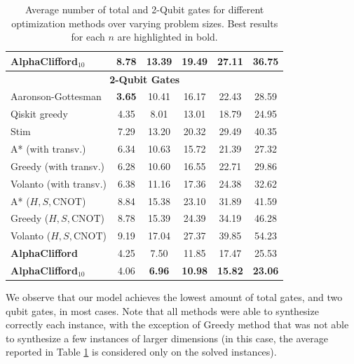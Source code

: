 \documentclass[conference]{IEEEtran}
\begin{document}
\begin{table}[htb]
\begin{tabular}{lccccc}
        \textbf{AlphaClifford$_{10}$} & \textbf{8.78} & \textbf{13.39} & \textbf{19.49} & \textbf{27.11} & \textbf{36.75} \\
        \midrule
        \multicolumn{6}{c}{\textbf{2-Qubit Gates}} \\
        \midrule
        Aaronson-Gottesman & \textbf{3.65} & 10.41 & 16.17 & 22.43 & 28.59 \\
        \textcolor{responsecolour}{Qiskit greedy} & \textcolor{responsecolour}{4.35} & \textcolor{responsecolour}{8.01} & \textcolor{responsecolour}{13.01} & \textcolor{responsecolour}{18.79} & \textcolor{responsecolour}{24.95}\\
        \textcolor{responsecolour}{Stim} & \textcolor{responsecolour}{7.29} & \textcolor{responsecolour}{13.20} & \textcolor{responsecolour}{20.32} & \textcolor{responsecolour}{29.49} & \textcolor{responsecolour}{40.35}\\
        \addlinespace
        A* (with transv.) & 6.34 & 10.63 & 15.72 & 21.39 & 27.32 \\
        Greedy (with transv.) & 6.28 & 10.60 & 16.55 & 22.71 & 29.86 \\
        Volanto (with transv.) & 6.38 & 11.16 & 17.36 & 24.38 & 32.62 \\
        \addlinespace
        A* ($H, S, \text{CNOT}$) & 8.84 & 15.38 & 23.10 & 31.89 & 41.59 \\
        Greedy ($H, S, \text{CNOT}$) & 8.78 & 15.39 & 24.39 & 34.19 & 46.28 \\
        Volanto ($H, S, \text{CNOT}$) & 9.19 & 17.04 & 27.37 & 39.85 & 54.23 \\
        \addlinespace
        \textbf{AlphaClifford} & 4.25 & 7.50 & 11.85 & 17.47 & 25.53 \\
        \textbf{AlphaClifford$_{10}$} & 4.06 & \textbf{6.96} & \textbf{10.98} & \textbf{15.82} & \textbf{23.06} \\
        \bottomrule
    \end{tabular}
    \caption{Average number of total and 2-Qubit gates for different optimization methods over varying problem sizes. Best results for each $n$ are highlighted in bold.}
    \label{tab:exp1_combined}
\end{table}

We observe that our model achieves the lowest amount of total gates, and two qubit gates, in most cases. Note that all methods were able to synthesize correctly each instance, with the exception of Greedy method that was not able to synthesize a few instances of larger dimensions (in this case, the average reported in Table \ref{tab:exp1_combined} is considered only on the solved instances).  
\end{document}
